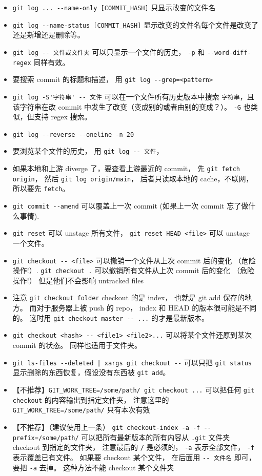 \begin{itemize}
\item \verb`git log ... --name-only [COMMIT_HASH]` 只显示改变的文件名
\item \verb`git log --name-status [COMMIT_HASH]` 显示改变的文件名每个文件是改变了还是新增还是删除等。
\item \verb`git log -- 文件或文件夹` 可以只显示一个文件的历史， \verb`-p` 和 \verb`--word-diff-regex` 同样有效。
\item 要搜索 commit 的标题和描述， 用 \verb`git log --grep=<pattern>`
\item \verb`git log -S'字符串' -- 文件` 可以在一个文件所有历史版本中搜索 \verb`字符串`，且该字符串在改 commit 中发生了改变（变成别的或者由别的变成？）。 \verb`-G` 也类似，但支持 regex 搜索。
\item \verb`git log --reverse --oneline -n 20`
\item 要浏览某个文件的历史， 用 \verb`git log -- 文件`， 
\item 如果本地和上游 diverge 了，要查看上游最近的 commit， 先 \verb`git fetch origin`， 然后 \verb`git log origin/main`， 后者只读取本地的 cache，不联网，所以要先 \verb`fetch`。
\item \verb`git commit --amend` 可以覆盖上一次 commit (如果上一次 commit 忘了做什么事情).
\item \verb`git reset` 可以 unstage 所有文件， \verb`git reset HEAD <file>` 可以 unstage 一个文件。
\item \verb`git checkout -- <file>` 可以撤销一个文件从上次 commit 后的变化 （危险操作!）. \verb`git checkout .` 可以撤销所有文件从上次 commit 后的变化 （危险操作!） 但是他们不会影响 untracked files
\item 注意 \verb`git checkout folder` checkout 的是 index， 也就是 git add 保存的地方。 而对于服务器上被 push 的 repo， index 和 HEAD 的版本很可能是不同的。 这时用 \verb`git checkout master -- ...` 的才是最新版本。
\item \verb`git checkout <hash> -- <file1> <file2>...` 可以将某个文件还原到某次 commit 的状态。 同样也适用于文件夹。
\item \verb`git ls-files --deleted | xargs git checkout --` 可以只把 \verb`git status` 显示删除的东西恢复，假设没有东西被 \verb`git add`。
\item 【不推荐】\verb`GIT_WORK_TREE=/some/path/ git checkout ...` 可以把任何 \verb`git checkout` 的内容输出到指定文件夹， 注意这里的 \verb`GIT_WORK_TREE=/some/path/` 只有本次有效
\item 【不推荐】（建议使用上一条） \verb`git checkout-index -a -f --prefix=/some/path/` 可以把所有最新版本的所有内容从 \verb`.git` 文件夹 checkout 到指定的文件夹， 注意最后的 \verb`/` 是必须的， \verb`-a` 表示全部文件， \verb`-f` 表示覆盖已有文件。 如果要 checkout 某个文件， 在后面用 \verb`-- 文件名` 即可， 要把 \verb`-a` 去掉。 这种方法不能 checkout 某个文件夹

\end{itemize}
